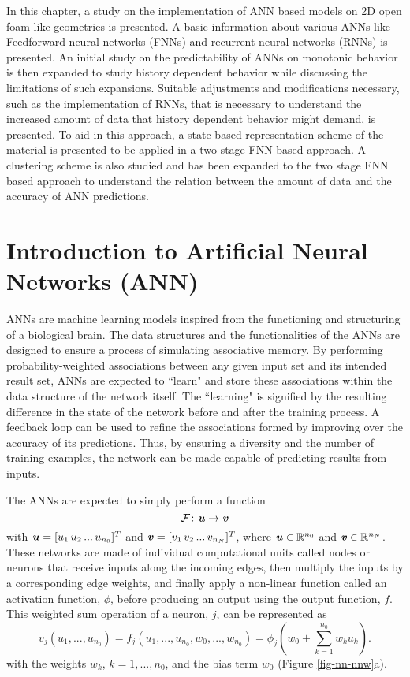 In this chapter, a study on the implementation of ANN based models on 2D open foam-like geometries is presented. A basic information about various ANNs like Feedforward neural networks (FNNs) and recurrent neural networks (RNNs) is presented. An initial study on the predictability of ANNs on monotonic behavior is then expanded to study history dependent behavior while discussing the limitations of such expansions. Suitable adjustments and modifications necessary, such as the implementation of RNNs, that is necessary to understand the increased amount of data that history dependent behavior might demand, is presented. To aid in this approach, a state based representation scheme of the material is presented to be applied in a two stage FNN based approach. A clustering scheme is also studied and has been expanded to the two stage FNN based approach to understand the relation between the amount of data and the accuracy of ANN predictions. 


\section{Introduction to Artificial Neural Networks (ANN)}\label{nn-ann}

ANNs are machine learning models inspired from the functioning and structuring of a biological brain. The data structures and the functionalities of the ANNs are designed to ensure a process of simulating associative memory. By performing probability-weighted associations between any given input set and its intended result set, ANNs are expected to ``learn" and store these associations within the data structure of the network itself. The ``learning" is signified by the resulting difference in the state of the network before and after the training process. A feedback loop can be used to refine the associations formed by improving over the accuracy of its predictions. Thus, by ensuring a diversity and the number of training examples, the network can be made capable of predicting results from inputs. 

The ANNs are expected to simply perform a function
\begin{equation}\label{eq-nn-func}
\mathcal{F}\colon\textbf{\textit{u}}\to\textbf{\textit{v}}
\end{equation}
with $ \textbf{\textit{u}}=[u_1\,u_2\,...\,u_{n_0}]^T $ and $ \textbf{\textit{v}}=[v_1\,v_2\,...\,v_{n_N}]^T $, where $ \textbf{\textit{u}}\in\mathbb{R}^{n_0} $ and $ \textbf{\textit{v}}\in\mathbb{R}^{n_N} $. These networks are made of individual computational units called nodes or neurons that receive inputs along the incoming edges, then multiply the inputs by a corresponding edge weights, and finally apply a non-linear function called an activation function, $ \phi $, before producing an output using the output function, $ f $. This weighted sum operation of a neuron, $ j $, can be represented as 
\begin{equation}\label{eq-nn-weight}
v_j(u_1,...,u_{n_0})=f_j(u_1,...,u_{n_0},w_0,...,w_{n_0})=\phi_j(w_0+\sum_{k=1}^{n_0}w_ku_k).
\end{equation}
with the weights $ w_{k} $, $ k=1,...,n_0 $, and the bias term $ w_{0} $ (Figure \ref{fig-nn-nnw}a).

